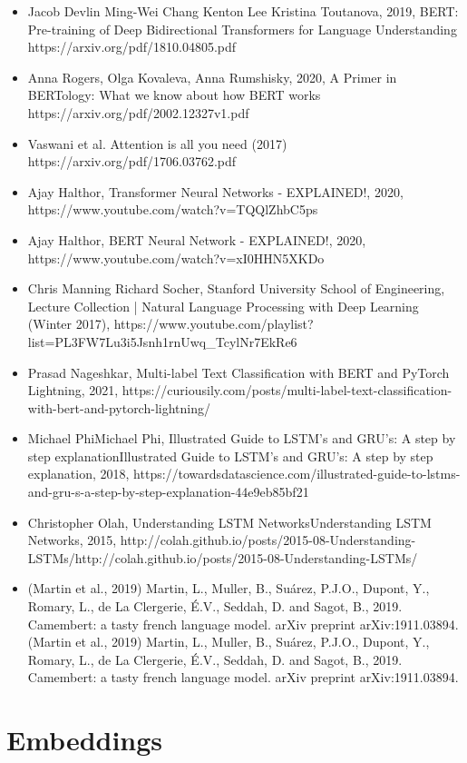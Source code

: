 \documentclass[8pt]{article}
\begin{document}
\begin{itemize}
\item Jacob Devlin Ming-Wei Chang Kenton Lee Kristina Toutanova, 2019, BERT: Pre-training of Deep Bidirectional Transformers for Language Understanding https://arxiv.org/pdf/1810.04805.pdf
\item Anna Rogers, Olga Kovaleva, Anna Rumshisky, 2020, A Primer in BERTology: What we know about how BERT works https://arxiv.org/pdf/2002.12327v1.pdf
\item Vaswani et al. Attention is all you need (2017) https://arxiv.org/pdf/1706.03762.pdf
\item Ajay Halthor, Transformer Neural Networks - EXPLAINED!, 2020, https://www.youtube.com/watch?v=TQQlZhbC5ps
\item Ajay Halthor, BERT Neural Network - EXPLAINED!, 2020, https://www.youtube.com/watch?v=xI0HHN5XKDo
\item Chris Manning Richard Socher,  Stanford University School of Engineering, Lecture Collection | Natural Language Processing with Deep Learning (Winter 2017), https://www.youtube.com/playlist?list=PL3FW7Lu3i5Jsnh1rnUwq\_TcylNr7EkRe6
\item Prasad Nageshkar, Multi-label Text Classification with BERT and PyTorch Lightning, 2021, https://curiousily.com/posts/multi-label-text-classification-with-bert-and-pytorch-lightning/
\item Michael PhiMichael Phi, Illustrated Guide to LSTM’s and GRU’s: A step by step explanationIllustrated Guide to LSTM’s and GRU’s: A step by step explanation, 2018, https://towardsdatascience.com/illustrated-guide-to-lstms-and-gru-s-a-step-by-step-explanation-44e9eb85bf21
\item Christopher Olah, Understanding LSTM NetworksUnderstanding LSTM Networks, 2015, http://colah.github.io/posts/2015-08-Understanding-LSTMs/http://colah.github.io/posts/2015-08-Understanding-LSTMs/
\item (Martin et al., 2019) Martin, L., Muller, B., Suárez, P.J.O., Dupont, Y., Romary, L., de La Clergerie, É.V., Seddah, D. and Sagot, B., 2019. Camembert: a tasty french language model. arXiv preprint arXiv:1911.03894.(Martin et al., 2019) Martin, L., Muller, B., Suárez, P.J.O., Dupont, Y., Romary, L., de La Clergerie, É.V., Seddah, D. and Sagot, B., 2019. Camembert: a tasty french language model. arXiv preprint arXiv:1911.03894.
\end{itemize}

    \hypertarget{embeddings}{%
\section{Embeddings}\label{embeddings}}
\end{document}
